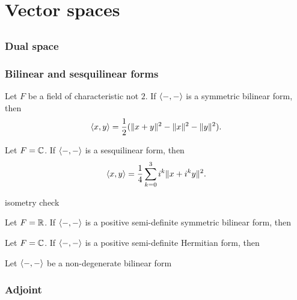 \documentclass{../note}
\begin{document}
\part{Vector spaces}


\chapter{}
\section{Dual space}

\begin{prb}
\end{prb}

\section{Bilinear and sesquilinear forms}

\begin{prb}
\begin{parts}
\item Let $F$ be a field of characteristic not $2$. If $\langle-,-\rangle$ is a symmetric bilinear form, then
\[\langle x,y\rangle=\frac12(\|x+y\|^2-\|x\|^2-\|y\|^2).\]
\item Let $F=\mathbb{C}$. If $\langle-,-\rangle$ is a sesquilinear form, then
\[\langle x,y\rangle=\frac14\sum_{k=0}^3i^k\|x+i^ky\|^2.\]
\item isometry check
\end{parts}
\end{prb}

\begin{prb}
\begin{parts}
\item Let $F=\mathbb{R}$. If $\langle-,-\rangle$ is a positive semi-definite symmetric bilinear form, then
\item Let $F=\mathbb{C}$. If $\langle-,-\rangle$ is a positive semi-definite Hermitian form, then
\end{parts}
\end{prb}

\begin{prb}
Let $\langle-,-\rangle$ be a non-degenerate bilinear form
\end{prb}

\section{Adjoint}
\begin{prb}
\end{prb}
\end{document}
